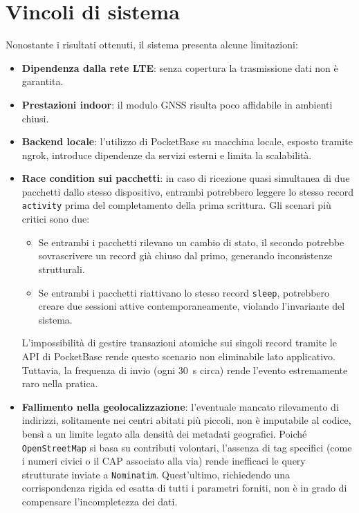 \documentclass[12pt,a4paper]{article}
\begin{document}
\section{Vincoli di sistema}
Nonostante i risultati ottenuti, il sistema presenta alcune limitazioni:
\begin{itemize}
    \item \textbf{Dipendenza dalla rete LTE}: senza copertura la trasmissione dati non è garantita.
    \item \textbf{Prestazioni indoor}: il modulo GNSS risulta poco affidabile in ambienti chiusi.
    \item \textbf{Backend locale}: l'utilizzo di PocketBase su macchina locale, 
        esposto tramite ngrok, introduce dipendenze da servizi esterni e limita la scalabilità.
    \item \textbf{Race condition sui pacchetti}: in caso di ricezione 
        quasi simultanea di due pacchetti dallo stesso dispositivo, 
        entrambi potrebbero leggere lo stesso record \texttt{activity} 
        prima del completamento della prima scrittura. 
        Gli scenari più critici sono due: 
        \begin{itemize}
            \item Se entrambi i pacchetti rilevano un cambio di stato, 
                il secondo potrebbe sovrascrivere un record già chiuso dal primo, 
                generando inconsistenze strutturali.
            \item Se entrambi i pacchetti riattivano 
                lo stesso record \texttt{sleep}, potrebbero creare due sessioni attive 
                contemporaneamente, violando l'invariante del sistema.
        \end{itemize}
        L'impossibilità di gestire transazioni atomiche 
        sui singoli record tramite le API di PocketBase 
        rende questo scenario non eliminabile lato applicativo. 
        Tuttavia, la frequenza di invio (ogni 30~s circa) 
        rende l’evento estremamente raro nella pratica.
    \item \textbf{Fallimento nella geolocalizzazione}: l'eventuale mancato rilevamento 
        di indirizzi, solitamente nei centri abitati più piccoli, 
        non è imputabile al codice, bensì a un limite legato alla densità dei metadati geografici. 
        Poiché \texttt{OpenStreetMap} si basa su contributi volontari, 
        l'assenza di tag specifici (come i numeri civici o il CAP associato alla via) 
        rende inefficaci le query strutturate inviate a \texttt{Nominatim}. 
        Quest'ultimo, richiedendo una corrispondenza rigida ed esatta di tutti i parametri forniti, 
        non è in grado di compensare l'incompletezza dei dati.
\end{itemize}
\end{document}

